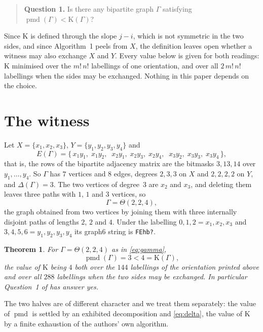 \documentclass[11pt]{amsart}
\newtheorem{theorem}{Theorem}
\theoremstyle{remark}
\newcommand{\pmd}{\operatorname{pmd}}
\newcommand{\Kinv}{\mathrm{K}}
\newcommand{\Gam}{\Gamma}
\begin{document}
\begin{quote}\sloppy
\textbf{Question 1.} Is there any bipartite graph $\Gam$
satisfying $\pmd(\Gam)<\Kinv(\Gam)$?
\end{quote}

\noindent Since $\Kinv$ is defined through the slope $j-i$, which is not symmetric in the
two sides, and since Algorithm~1 peels from $X$, the definition leaves open
whether a witness may also exchange $X$ and $Y$. Every value below is given for
both readings: $\Kinv$ minimised over the $m!\,n!$ labellings of one
orientation, and over all $2\,m!\,n!$ labellings when the sides may be
exchanged. Nothing in this paper depends on the choice.

\section{The witness}

Let $X=\{x_1,x_2,x_3\}$, $Y=\{y_1,y_2,y_3,y_4\}$ and
\begin{equation}\label{eq:gamma}
  E(\Gam)=\{\,x_1y_1,\;x_1y_2,\;\;x_2y_1,\;x_2y_3,\;x_2y_4,\;\;
              x_3y_2,\;x_3y_3,\;x_3y_4\,\},
\end{equation}
that is, the rows of the bipartite adjacency matrix are the bitmasks
$3,13,14$ over $y_1,\dots,y_4$. So $\Gam$ has $7$ vertices and $8$ edges,
degrees $2,3,3$ on $X$ and $2,2,2,2$ on $Y$, and $\Delta(\Gam)=3$. The two
vertices of degree~$3$ are $x_2$ and $x_3$, and deleting them leaves three
paths with $1$, $1$ and $3$ vertices, so
\[
  \Gam=\Theta(2,2,4),
\]
the graph obtained from two vertices by joining them with three internally
disjoint paths of lengths $2$, $2$ and $4$. Under the labelling
$0,1,2=x_1,x_2,x_3$ and $3,4,5,6=y_1,y_2,y_3,y_4$ its graph6 string is
\texttt{FEhb?}.

\begin{theorem}\label{thm:main}
For $\Gam=\Theta(2,2,4)$ as in \eqref{eq:gamma},
\[
  \pmd(\Gam)=3<4=\Kinv(\Gam),
\]
the value of $\Kinv$ being $4$ both over the $144$ labellings of the
orientation printed above and over all $288$ labellings when the two sides may
be exchanged. In particular Question~1 of \cite{FGY} has answer \emph{yes}.
\end{theorem}

The two halves are of different character and we treat them separately: the
value of $\pmd$ is settled by an exhibited decomposition and \eqref{eq:delta},
the value of $\Kinv$ by a finite exhaustion of the authors' own algorithm.
\end{document}
